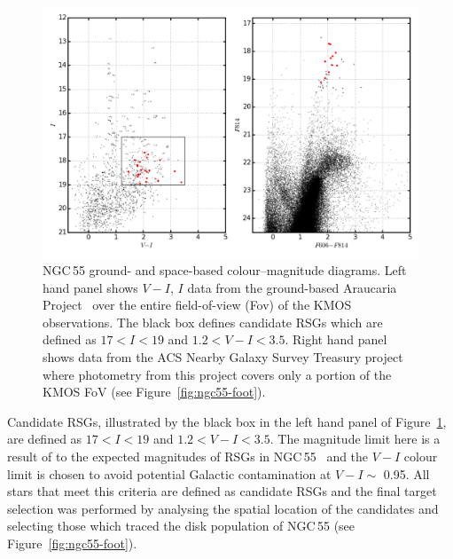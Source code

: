\begin{figure}
  \centering
  \includegraphics[width=\textwidth]{ngc55/ngc55-v_i_both}
 \caption[NGC\,55 ground- and space-based colour--magnitude diagrams]{
  NGC\,55 ground- and space-based colour--magnitude diagrams. Left hand panel shows $V-I$, $I$ data from the ground-based Araucaria Project~\cite{2005Msngr.121...23G}
  over the entire field-of-view (Fov) of the KMOS observations.
  The black box defines candidate RSGs which are defined as
  $17 < I < 19$ and $1.2 < V-I < 3.5$.
  Right hand panel shows data from the ACS Nearby Galaxy Survey Treasury
  \citep[ANGST][]{2009ApJS..183...67D} project where photometry from this project covers only a portion of the KMOS FoV (see Figure~\ref{fig:ngc55-foot}).
          }
 \label{fig:VI}
\end{figure}


Candidate RSGs, illustrated by the black box in the left hand panel of Figure~\ref{fig:VI}, are defined as $17 < I < 19$ and $1.2 < V-I < 3.5$.
The magnitude limit here is a result of to the expected magnitudes of RSGs in NGC\,55~\citep[e.g.][who identified RSGs in NGC\,300]{2015ApJ...805..182G} and the $V-I$ colour limit is chosen to avoid potential Galactic contamination at $V-I\sim$ 0.95.
All stars that meet this criteria are defined as candidate RSGs and the final target selection was performed by analysing the spatial location of the candidates and selecting those which traced the disk population of NGC\,55 (see Figure~\ref{fig:ngc55-foot}).

